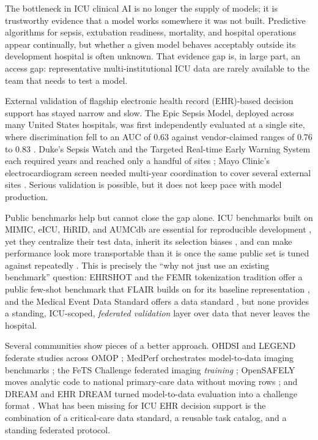 \documentclass[12pt]{article}
\begin{document}
The bottleneck in ICU clinical AI is no longer the supply of models; it is trustworthy evidence that a model works somewhere it was not built. Predictive algorithms for sepsis, extubation readiness, mortality, and hospital operations appear continually, but whether a given model behaves acceptably outside its development hospital is often unknown. That evidence gap is, in large part, an access gap: representative multi-institutional ICU data are rarely available to the team that needs to test a model.

External validation of flagship electronic health record (EHR)-based decision support has stayed narrow and slow. The Epic Sepsis Model, deployed across many United States hospitals, was first independently evaluated at a single site, where discrimination fell to an AUC of 0.63 against vendor-claimed ranges of 0.76 to 0.83 \citep{wong2021external,habib2021jamaeditorial}. Duke's Sepsis Watch and the Targeted Real-time Early Warning System each required years and reached only a handful of sites \citep{sendak2025sepsiswatchportability,adams2022trews}; Mayo Clinic's electrocardiogram screen needed multi-year coordination to cover several external sites \citep{carter2025mayoecgai}. Serious validation is possible, but it does not keep pace with model production.

Public benchmarks help but cannot close the gap alone. ICU benchmarks built on MIMIC, eICU, HiRID, and AUMCdb are essential for reproducible development \citep{vandewater2023yaib,yeche2021hirid,pollard2018eicu}, yet they centralize their test data, inherit its selection biases \citep{roosli2022mimicfairness}, and can make performance look more transportable than it is once the same public set is tuned against repeatedly \citep{recht2019imagenet,chekroud2024illusory}. This is precisely the ``why not just use an existing benchmark'' question: EHRSHOT and the FEMR tokenization tradition offer a public few-shot benchmark that FLAIR builds on for its baseline representation \citep{wornow2023ehrshot,steinberg2021femr}, and the Medical Event Data Standard offers a data standard \citep{arnrich2025meds}, but none provides a standing, ICU-scoped, \emph{federated validation} layer over data that never leaves the hospital.

Several communities show pieces of a better approach. OHDSI and LEGEND federate studies across OMOP \citep{reps2020ohdsistroke}; MedPerf orchestrates model-to-data imaging benchmarks \citep{karargyris2023medperf}; the FeTS Challenge federated imaging \emph{training} \citep{pati2022fets}; OpenSAFELY moves analytic code to national primary-care data without moving rows \citep{opensafely2021naturemedicine}; and DREAM and EHR DREAM turned model-to-data evaluation into a challenge format \citep{guinney2018dream,bergquist2024ehrdream}. What has been missing for ICU EHR decision support is the combination of a critical-care data standard, a reusable task catalog, and a standing federated protocol.
\end{document}
